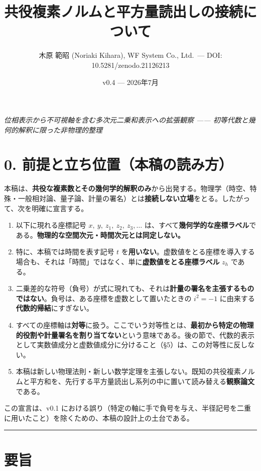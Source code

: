 \documentclass[11pt,a4paper]{ltjsarticle}
\title{共役複素ノルムと平方量読出しの接続について}
\author{木原 範昭 (Noriaki Kihara), WF System Co., Ltd.~--- DOI:
10.5281/zenodo.21126213}
\date{v0.4 --- 2026年7月}
\providecommand{\tightlist}{\setlength{\itemsep}{0pt}\setlength{\parskip}{0pt}}
\begin{document}
\maketitle
\emph{位相表示から不可視軸を含む多次元二乗和表示への拡張観察 ------
初等代数と幾何的解釈に限った非物理的整理}

\section{0.
前提と立ち位置（本稿の読み方）}\label{ux524dux63d0ux3068ux7acbux3061ux4f4dux7f6eux672cux7a3fux306eux8aadux307fux65b9}

本稿は、\textbf{共役な複素数とその幾何学的解釈のみ}から出発する。物理学（時空、特殊・一般相対論、量子論、計量の署名）とは\textbf{接続しない立場}をとる。したがって、次を明確に宣言する。

\begin{enumerate}
\def\labelenumi{\arabic{enumi}.}
\tightlist
\item
  以下に現れる座標記号 \(x,\ y,\ z_1,\ z_2,\ z_3,\dots\)
  は、すべて\textbf{幾何学的な座標ラベル}である。\textbf{物理的な空間次元・時間次元とは同定しない。}
\item
  特に、本稿では時間を表す記号 \(t\)
  を\textbf{用いない}。虚数値をとる座標を導入する場合も、それは「時間」ではなく、単に\textbf{虚数値をとる座標ラベル}
  \(z_h\) である。
\item
  二乗差的な符号（負号）が式に現れても、それは\textbf{計量の署名を主張するものではない}。負号は、ある座標を虚数として置いたときの
  \(i^2=-1\) に由来する\textbf{代数的帰結}にすぎない。
\item
  すべての座標軸は\textbf{対等}に扱う。ここでいう対等性とは、\textbf{最初から特定の物理的役割や計量署名を割り当てない}という意味である。後の節で、代数的表示として実数値成分と虚数値成分に分けること（§5）は、この対等性に反しない。
\item
  本稿は新しい物理法則・新しい数学定理を主張しない。既知の共役複素ノルムと平方和を、先行する平方量読出し系列の中に置いて読み替える\textbf{観察論文}である。
\end{enumerate}

この宣言は、v0.1
における誤り（特定の軸に手で負号を与え、半径記号を二重に用いたこと）を除くための、本稿の設計上の土台である。

\begin{center}\rule{0.5\linewidth}{0.5pt}\end{center}

\section{要旨}\label{ux8981ux65e8}
\end{document}
